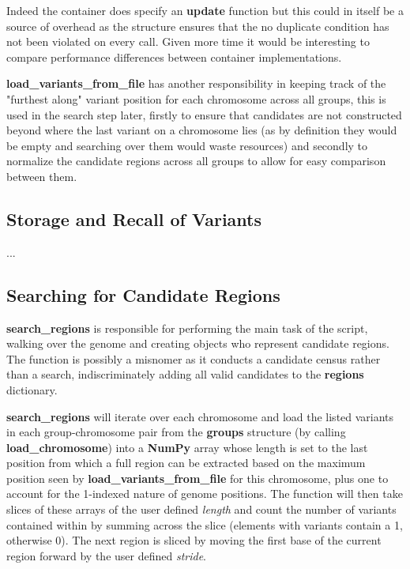 Indeed the container does specify an \textbf{update} function but this could in
itself be a source of overhead as the structure ensures that the no duplicate
condition has not been violated on every call. Given more time it would be
interesting to compare performance differences between container implementations.

\textbf{load\_variants\_from\_file} has another responsibility in keeping track
of the "furthest along" variant position for each chromosome across all groups,
this is used in the search step later, firstly to ensure that candidates are not
constructed beyond where the last variant on a chromosome lies (as by definition
they would be empty and searching over them would waste resources) and secondly
to normalize the candidate regions across all groups to allow for easy
comparison between them.


\subsection{Storage and Recall of Variants}

...

\subsection{Searching for Candidate Regions}

\textbf{search\_regions} is responsible for performing the main task of the
script, walking over the genome and creating objects who represent candidate
regions. The function is possibly a misnomer as it conducts a candidate census
rather than a search, indiscriminately adding all valid candidates to the
\textbf{regions} dictionary.

\textbf{search\_regions} will iterate over each chromosome and load the listed
variants in each group-chromosome pair from the \textbf{groups} structure (by
calling \textbf{load\_chromosome}) into a
\textbf{NumPy} array whose length is set to the last position from which a full
region can be extracted based on the maximum position seen by
\textbf{load\_variants\_from\_file} for this chromosome, plus one to account for
the 1-indexed nature of genome positions. The function will then take slices of
these arrays of the user defined \textit{length} and count the number of
variants contained within by summing across the slice (elements with variants
contain a 1, otherwise 0). The next region is sliced by moving the first base of
the current region forward by the user defined \textit{stride}.

